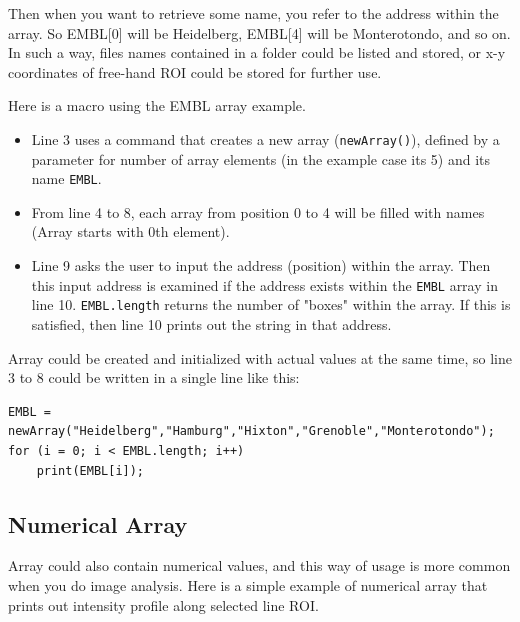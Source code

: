 \documentclass[11pt,a4paper,oneside]{report}
\newcommand{\ilcom}[1]{\texttt{\small#1}}
\begin{document}
Then when you want to retrieve some name, you refer to the address within the array. 
So EMBL[0] will be Heidelberg, EMBL[4] will be Monterotondo, and so on. 
In such a way, files names contained in a folder could be listed and stored, 
or x-y coordinates of free-hand ROI could be stored for further use. 

Here is a macro using the EMBL array example. 



\begin{itemize}
\item Line 3 uses a command that creates a new array (\ilcom{newArray()}),
defined by a parameter for number of array elements (in the example case its 5) and its name \ilcom{EMBL}.
\item From line 4 to 8, each array from position 0 to 4 will be filled with
names (Array starts with 0th element).
\item Line 9 asks the user to input the address (position) within the array.
Then this input address is examined if the address exists within the
\ilcom{EMBL} array in line 10. \ilcom{EMBL.length} returns the number of "boxes"
within the array. If this is satisfied, then line 10 prints out the string in that address.
\end{itemize}

Array could be created and initialized with actual values at the
same time, so line 3 to 8 could be written in a single line like this: 
\begin{lstlisting}[numbers=none]
EMBL = newArray("Heidelberg","Hamburg","Hixton","Grenoble","Monterotondo");
for (i = 0; i < EMBL.length; i++)
	print(EMBL[i]);
\end{lstlisting}

\subsection{Numerical Array}

Array could also contain numerical values, and this way of usage is more common when you do image analysis. Here is a simple example of numerical array that prints out intensity profile along selected line ROI. 


\end{document}

